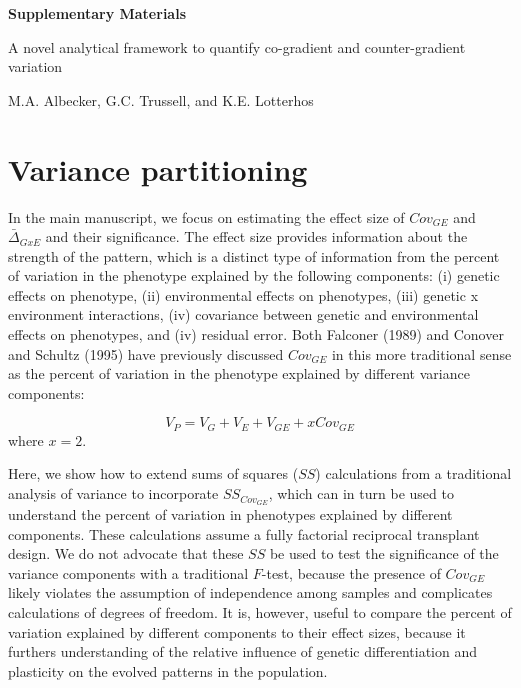 \documentclass[11pt, oneside]{amsart}
\begin{document}


{ \Large \bf Supplementary Materials}

A novel analytical framework to quantify co-gradient and counter-gradient variation 

M.A. Albecker, G.C. Trussell, and K.E. Lotterhos

\hspace{3cm}

\tableofcontents
\listoffigures

\newpage
\renewcommand\thesection{Supplemental Methods}
\section{Variance partitioning}

In the main manuscript, we focus on estimating the effect size of $Cov_{GE}$ and $\bar\Delta_{GxE}$ and their significance. The effect size provides information about the strength of the pattern, which is a distinct type of information from the percent of variation in the phenotype explained by the following components: (i) genetic effects on phenotype, (ii) environmental effects on phenotypes, (iii) genetic x environment interactions, (iv) covariance between genetic and environmental effects on phenotypes, and (iv) residual error. Both Falconer (1989) and Conover and Schultz (1995) have previously discussed $Cov_{GE}$ in this more traditional sense as the percent of variation in the phenotype explained by different variance components:

\begin{equation}
V_P = V_G + V_E + V_{GE} + xCov_{GE} 
\end{equation}
where $x = 2$.

Here, we show how to extend sums of squares ($SS$) calculations from a traditional analysis of variance to incorporate $SS_{Cov_{GE}}$, which can in turn be used to understand the percent of variation in phenotypes explained by different components.  These calculations assume a fully factorial reciprocal transplant design. We do not advocate that these $SS$ be used to test the significance of the variance components with a traditional $F$-test, because the presence of $Cov_{GE}$ likely violates the assumption of independence among samples and complicates calculations of degrees of freedom.  It is, however, useful to compare the percent of variation explained by different components to their effect sizes, because it furthers understanding of the relative influence of genetic differentiation and plasticity on the evolved patterns in the population.
\end{document}
